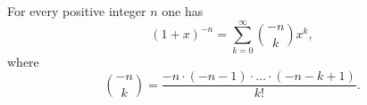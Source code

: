 

\setcounter{section}{2}
\setcounter{subsection}{4}
\setcounter{dfn}{13}

\begin{thm}
\label{thm:BinomNeg}
For every positive integer $n$ one has
\begin{equation}
\label{eqn:BinomNeg}
(1+x)^{-n} = \sum_{k=0}^\infty \binom{-n}{k} x^k,
\end{equation}
where
\[
\binom{-n}{k} = \frac{-n \cdot (-n-1) \cdot \ldots \cdot (-n-k+1)}{k!}.
\]
\end{thm}

